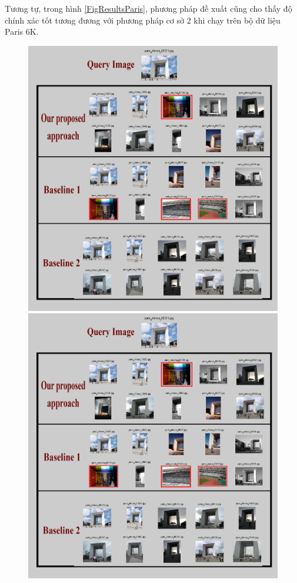Tương tự, trong hình \ref{FigResultsParis}, phương pháp đề xuất cũng cho thấy độ chính xác tốt tương đương với phương pháp cơ sở 2 khi chạy trên bộ dữ liệu Paris 6K.

\begin{figure}[!htbp]
  \begin{center}
    \leavevmode
    \ifpdf
      \includegraphics[scale=0.2]{resParis6k}
    \else
      \includegraphics[scale=0.2]{resParis6k}

\end{center}
\end{figure}
